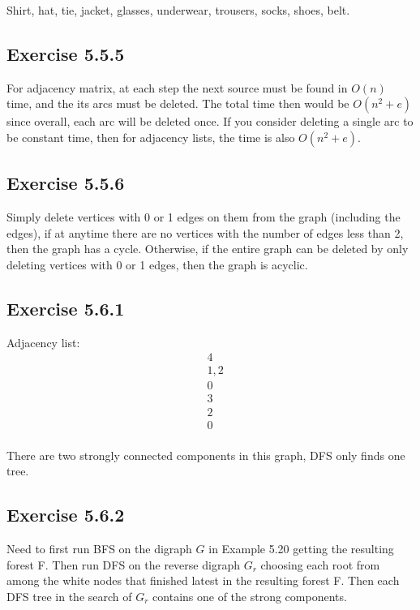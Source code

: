 \documentclass{article}
\begin{document}
Shirt, hat, tie, jacket, glasses, underwear, trousers, socks, shoes, belt.


\subsection*{Exercise 5.5.5}

For adjacency matrix, at each step the next source must be found in \(O(n)\) time, and the its arcs must be deleted. The total time then would be \(O(n^2 + e)\) since overall, each arc will be deleted once. If you consider deleting a single arc to be constant time, then for adjacency lists, the time is also \(O(n^2 + e)\).


\subsection*{Exercise 5.5.6}

Simply delete vertices with 0 or 1 edges on them from the graph (including the edges), if at anytime there are no vertices with the number of edges less than 2, then the graph has a cycle. Otherwise, if the entire graph can be deleted by only deleting vertices with 0 or 1 edges, then the graph is acyclic.


\subsection*{Exercise 5.6.1} 

Adjacency list:
\begin{align*}
&4 \\
&1,2 \\
&0 \\
&3 \\
&2 \\
&0 \\
\end{align*}

There are two strongly connected components in this graph, DFS only finds one tree.


\subsection*{Exercise 5.6.2}

Need to first run BFS on the digraph \(G\) in Example 5.20 getting the resulting forest F. Then run DFS on the reverse digraph \(G_r\) choosing each root from among the white nodes that finished latest in the resulting forest F. Then each DFS tree in the search of \(G_r\) contains one of the strong components.
\end{document}
